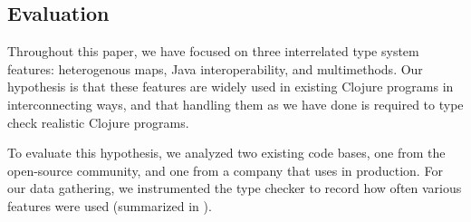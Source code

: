 %
%
%

\subsection{Evaluation}
\label{sec:casestudy}

Throughout this paper, we have focused on three interrelated type
system features: heterogenous maps, Java interoperability, and
multimethods. Our hypothesis is that these features are widely used in
existing Clojure programs in interconnecting ways, and that handling
them as we have done is required to type check realistic Clojure
programs.



To evaluate this hypothesis, we analyzed two existing \coretyped{}
code bases, one from the open-source community, and one from a company
that uses \coretyped{} in production. For our data gathering, we
instrumented the \coretyped{} type checker to record how often
various features were used (summarized in 
). 

